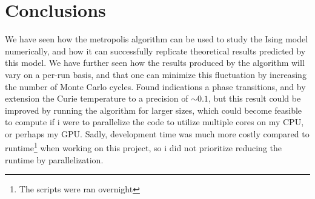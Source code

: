 \documentclass[10pt,showpacs,preprintnumbers,amsmath,amssymb,nofootinbib,aps,prl,twocolumn,groupedaddress,superscriptaddress,showkeys]{revtex4-1}
\begin{document}
  
\section{Conclusions}
  We have seen how the metropolis algorithm can be used to study the Ising model numerically, and how it can successfully replicate theoretical results predicted by this model. We have further seen how the results produced by the algorithm will vary on a per-run basis, and that one can minimize this fluctuation by increasing the number of Monte Carlo cycles.
  Found indications a phase transitions, and by extension the Curie temperature to a precision of $\sim 0.1$, but this result could be improved by running the algorithm for larger sizes, which could become feasible to compute if i were to parallelize the code to utilize multiple cores on my CPU, or perhaps my GPU. Sadly, development time was much more costly compared to runtime\footnote{The scripts were ran overnight} when working on this project, so i did not prioritize reducing the runtime by parallelization.


\end{document}
